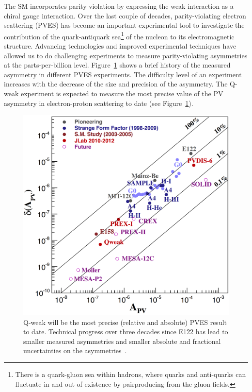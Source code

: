 The SM incorporates parity violation by expressing the weak interaction as a chiral gauge interaction. Over the last couple of decades, parity-violating electron scattering (PVES) has become an important experimental tool to investigate the contribution of the quark-antiquark sea\footnote{There is a  quark-gluon sea within hadrons, where quarks and anti-quarks can fluctuate in and out of existence by pairproducing from the gluon fields.} of the nucleon to its electromagnetic structure. 
Advancing technologies and improved experimental techniques have allowed us to do challenging experiments to measure parity-violating asymmetries at the parts-per-billion level.
Figure~\ref{fig:PVAsymmetry} shows a brief history of the measured asymmetry in different PVES experiments. The difficulty level of an experiment increases with the decrease of the size and precision of the asymmetry. The Q-weak experiment is expected to measure the most precise value of the PV asymmetry in electron-proton scattering to date (see Figure~\ref{fig:PVAsymmetry}). 

\begin{singlespace}
\begin{figure}[!h]
	\begin{center}
	\includegraphics[width=15.0cm]{figures/PVAsymmetry}
	\end{center}
	\caption
	{Q-weak will be the most precise (relative and absolute) PVES result to date. Technical progress over three decades since E122 has lead to smaller measured asymmetries and smaller absolute and fractional uncertainties on the asymmetries~\cite{presentation:kent_crex}.	
	}
	\label{fig:PVAsymmetry}
\end{figure}
\end{singlespace}


